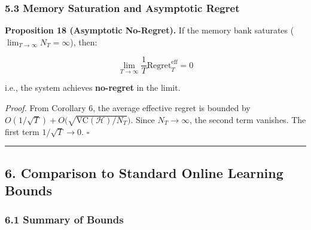 \documentclass[
  12pt,
]{ctexart}
\begin{document}
\subsubsection{5.3 Memory Saturation and Asymptotic
Regret}\label{memory-saturation-and-asymptotic-regret}

\textbf{Proposition 18 (Asymptotic No-Regret).} If the memory bank
saturates (\(\lim_{T\to\infty} N_T = \infty\)), then:

\[\lim_{T\to\infty} \frac{1}{T} \text{Regret}_T^{\text{eff}} = 0\]

i.e., the system achieves \textbf{no-regret} in the limit.

\emph{Proof.} From Corollary 6, the average effective regret is bounded
by \(O(1/\sqrt{T}) + O\bigl( \sqrt{\text{VC}(\mathcal{H})/N_T} \bigr)\).
Since \(N_T \to \infty\), the second term vanishes. The first term
\(1/\sqrt{T} \to 0\). \(\square\)

\begin{center}\rule{0.5\linewidth}{0.5pt}\end{center}

\subsection{6. Comparison to Standard Online Learning
Bounds}\label{comparison-to-standard-online-learning-bounds}

\subsubsection{6.1 Summary of Bounds}\label{summary-of-bounds}
\end{document}
